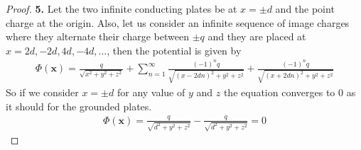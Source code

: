 \documentclass[11pt]{article}
\theoremstyle{definition}
\begin{document}
\cleardoublepage
\begin{proof}{\textbf{5.}}
    Let the two infinite conducting plates be at $x=\pm d$ and the point charge
    at the origin. Also, let us consider an infinite sequence of image charges
    where they alternate their charge between $\pm q$ and they are placed at
    $x = 2d, -2d, 4d, -4d, ...$, then the potential is given by
    \begin{align*}
        \Phi(\bm{x}) = \frac{q}{\sqrt{x^2+y^2 + z^2}}
        + \sum_{n=1}^\infty \frac{(-1)^nq}{\sqrt{(x- 2dn)^2 + y^2 + z^2}}
        + \frac{(-1)^nq}{\sqrt{(x + 2dn)^2 + y^2 + z^2}}
    \end{align*}
    So if we consider $x=\pm d$ for any value of $y$ and $z$ the equation
    converges to 0 as it should for the grounded plates.
    \begin{align*}
        \Phi(\bm{x}) = \frac{q}{\sqrt{d^2+y^2 + z^2}}
        - \frac{q}{\sqrt{d^2 + y^2 + z^2}} = 0
    \end{align*}
\end{proof}
\end{document}
